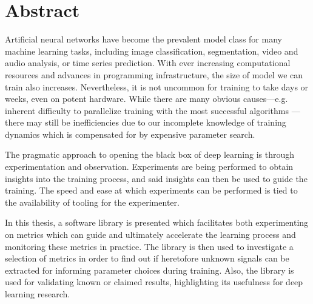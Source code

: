 \chapter*{Abstract}

Artificial neural networks have become the prevalent model class for many
machine learning tasks, including image classification, segmentation, video and
audio analysis, or time series prediction. With ever increasing computational
resources and advances in programming infrastructure, the size of model we can
train also increases. Nevertheless, it is not uncommon for training to take days
or weeks, even on potent hardware. While there are many obvious causes---e.g.
inherent difficulty to parallelize training with the most successful algorithms
---there may still be inefficiencies due to our incomplete knowledge of training
dynamics which is compensated for by expensive parameter search.

The pragmatic approach to opening the black box of deep learning is
through experimentation and observation. Experiments are being performed to
obtain insights into the training process, and said insights can then be used to
guide the training.  The speed and ease at which experiments can be performed is
tied to the availability of tooling for the experimenter.

In this thesis, a software library is presented which facilitates both
experimenting on metrics which can guide and ultimately accelerate the learning
process and monitoring these metrics in practice. The library is then used to
investigate a selection of metrics in order to find out if heretofore unknown
signals can be extracted for informing parameter choices during training. Also,
the library is used for validating known or claimed results, highlighting its
usefulness for deep learning research.
